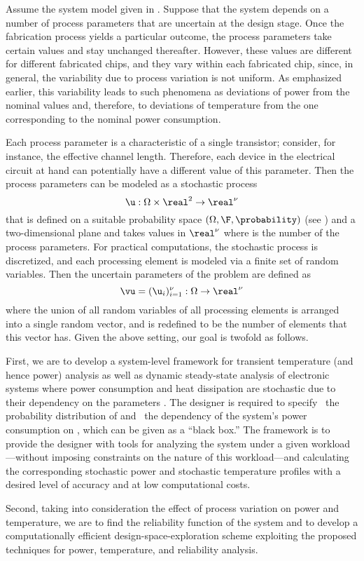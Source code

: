 Assume the system model given in . Suppose that the system
depends on a number of process parameters that are uncertain at the design
stage. Once the fabrication process yields a particular outcome, the process
parameters take certain values and stay unchanged thereafter. However, these
values are different for different fabricated chips, and they vary within each
fabricated chip, since, in general, the variability due to process variation is
not uniform. As emphasized earlier, this variability leads to such phenomena as
deviations of power from the nominal values and, therefore, to deviations of
temperature from the one corresponding to the nominal power consumption.

Each process parameter is a characteristic of a single transistor; consider, for
instance, the effective channel length. Therefore, each device in the electrical
circuit at hand can potentially have a different value of this parameter. Then the
process parameters can be modeled as a stochastic process
\[
  \u: \Omega \times \real^2 \to \real^\nu
\]
that is defined on a suitable probability space $(\Omega, \F, \probability)$
(see ) and a two-dimensional plane and takes values in
$\real^\nu$ where \nu is the number of the process parameters. For practical
computations, the stochastic process is discretized, and each processing element
is modeled via a finite set of random variables. Then the uncertain parameters
of the problem are defined as
\[
  \vu = (\u_i)_{i = 1}^\nu: \Omega \to \real^\nu
\]
where the union of all random variables of all processing elements is arranged
into a single random vector, and \nu is redefined to be the number of elements
that this vector has. Given the above setting, our goal is twofold as follows.

First, we are to develop a system-level framework for transient temperature (and
hence power) analysis as well as dynamic steady-state analysis of electronic
systems where power consumption and heat dissipation are stochastic due to their
dependency on the parameters \vu. The designer is required to specify \one~the
probability distribution of \vu and \two~the dependency of the system's power
consumption on \vu, which can be given as a ``black box.'' The framework is to
provide the designer with tools for analyzing the system under a given
workload---without imposing constraints on the nature of this workload---and
calculating the corresponding stochastic power \mp and stochastic temperature
\mq profiles with a desired level of accuracy and at low computational costs.

Second, taking into consideration the effect of process variation on power and
temperature, we are to find the reliability function of the system and to
develop a computationally efficient design-space-exploration scheme exploiting
the proposed techniques for power, temperature, and reliability analysis.
